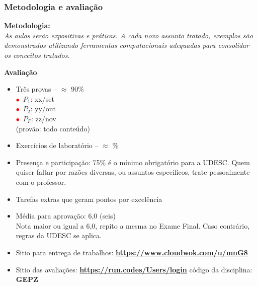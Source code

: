 \begin{frame}[allowframebreaks=0.9]

\frametitle{Metodologia e avaliação}

\textbf{Metodologia:} \\

\textit{As aulas serão expositivas e práticas. A cada novo assunto tratado, exemplos  são demonstrados utilizando ferramentas computacionais adequadas para consolidar os conceitos 
 tratados. 
 }


\newpage
    \textbf{Avaliação}

    \begin{itemize}
    \item Três provas -- $\approx$  90\%\\
      
	\quad \textcolor{red}{$\bullet$}~$P_1$: xx/set\\
	\quad \textcolor{red}{$\bullet$}~$P_2$: yy/out\\
	\quad \textcolor{red}{$\bullet$}~$P_F$: zz/nov\\(provão: todo conteúdo)

      \item Exercícios de laboratório  -- $\approx$ \%
       
      \item Presença e participação: 75\% é o mínimo obrigatório
      para a UDESC. Quem quiser faltar por razões diversas,
       ou assuntos específicos, trate pessoalmente com o professor.
        
      \item Tarefas extras que geram pontos por excelência 
      
      \item Média para aprovação: 6,0 (seis)\\
      Nota maior ou igual a 6,0, repito a mesma no Exame Final. Caso contrário, regras da UDESC se aplica.
      
      \item Sitio para entrega de trabalhos: \textbf{\url{https://www.cloudwok.com/u/mnG8}}
      
      \item Sitio das avaliações: \textbf{\url{https://run.codes/Users/login}} código da disciplina: \textbf{GEPZ}
      
    \end{itemize}

\end{frame}



